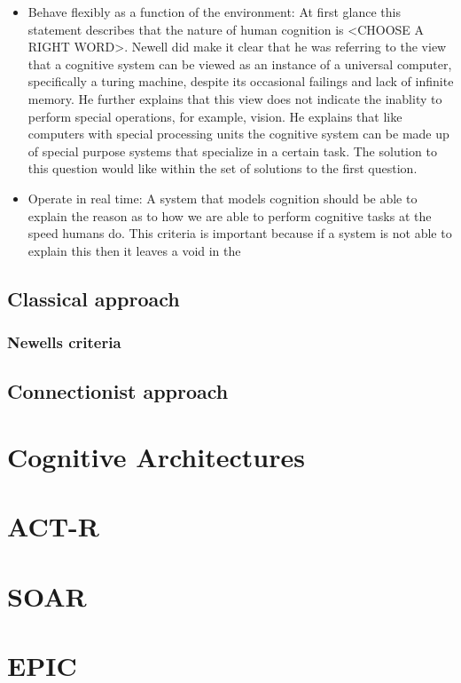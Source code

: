 \begin{itemize}
\item Behave flexibly as a function of the environment: At first
glance this statement describes that the nature of human cognition
is <CHOOSE A RIGHT WORD>. Newell did make it clear that he was referring
to the view that a cognitive system can be viewed as an instance of a
universal computer, specifically a turing machine, despite its occasional
failings and lack of infinite memory. He further explains that this
view does not indicate the inablity to perform special operations, for
example, vision. He explains that like computers with special
processing units the cognitive system can be made up of special
purpose systems that specialize in a certain task. The solution to
this question would like within the set of solutions to the first
question. 

\item Operate in real time: A system that models cognition should be
able to explain the reason as to how we are able to perform cognitive
tasks at the speed humans do. This criteria is important because if a
system is not able to explain this then it leaves a void in the 

\end{itemize}


\subsection{Classical approach}
\subsubsection{Newells criteria}
\subsection{Connectionist approach}
\section{Cognitive Architectures}
\section{ACT-R}
\section{SOAR}
\section{EPIC}
